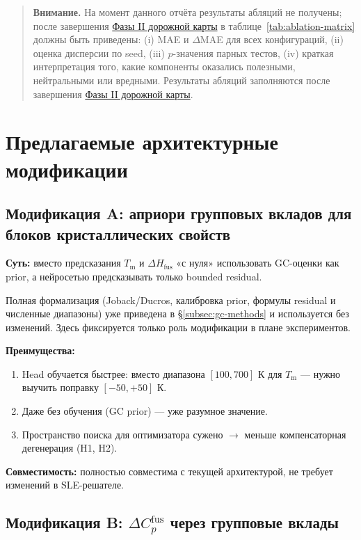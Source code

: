 \documentclass[11pt]{article}
\newcommand{\warnnote}[1]{\begin{quote}\textbf{Внимание.} #1\end{quote}}
\begin{document}
\warnnote{На момент данного отчёта результаты абляций не получены; после завершения \hyperref[subsec:roadmap-phase2]{Фазы II дорожной карты} в таблице~\ref{tab:ablation-matrix} должны быть приведены: (i) MAE и $\Delta$MAE для всех конфигураций, (ii) оценка дисперсии по seed, (iii) $p$-значения парных тестов, (iv) краткая интерпретация того, какие компоненты оказались полезными, нейтральными или вредными. Результаты абляций заполняются после завершения \hyperref[subsec:roadmap-phase2]{Фазы II дорожной карты}.}

\section{Предлагаемые архитектурные модификации}

\subsection{Модификация A: априори групповых вкладов для блоков кристаллических свойств}
\label{subsec:mod-a}

\textbf{Суть:} вместо предсказания $T_{\mathrm{m}}$ и $\Delta H_{\mathrm{fus}}$ «с нуля» использовать GC-оценки как prior, а нейросетью предсказывать только bounded residual.

Полная формализация (Joback/Ducros, калибровка prior, формулы residual и численные диапазоны) уже приведена в §\ref{subsec:gc-methods} и используется без изменений. Здесь фиксируется только роль модификации в плане экспериментов.

\textbf{Преимущества:}
\begin{enumerate}
  \item Head обучается быстрее: вместо диапазона $[100, 700]$ К для $T_{\mathrm{m}}$ --- нужно выучить поправку $[-50, +50]$ К.
  \item Даже без обучения (GC prior) --- уже разумное значение.
  \item Пространство поиска для оптимизатора сужено $\to$ меньше компенсаторная дегенерация (H1, H2).
\end{enumerate}

\textbf{Совместимость:} полностью совместима с текущей архитектурой, не требует изменений в SLE-решателе.

\subsection{Модификация B: $\Delta C_p^{\mathrm{fus}}$ через групповые вклады}
\label{subsec:mod-b}
\end{document}
